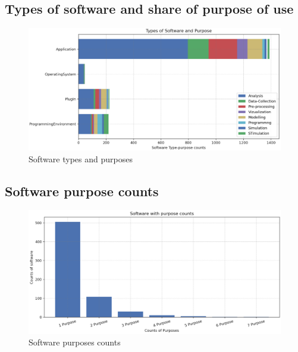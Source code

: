 \subsection{Types of software and share of purpose of use}
\label{subsec:dataset:Analysis:share}

\begin{figure}[htbp]
	\centering
	\includegraphics[width=1.1\textwidth]{4.graphics/figures/analysisresults/6.Types of Software and Purpose stacked bar}
	\caption{Software types and purposes}
	\label{fig:chapter03:setup}
\end{figure}

\subsection{Software purpose counts}
\label{subsec:dataset:Analysis:counts}

\begin{figure}[htbp]
	\centering
	\includegraphics[width=1.1\textwidth]{4.graphics/figures/analysisresults/7.counts of software purpose}
	\caption{Software purposes counts}
	\label{fig:chapter03:setup}
\end{figure}


